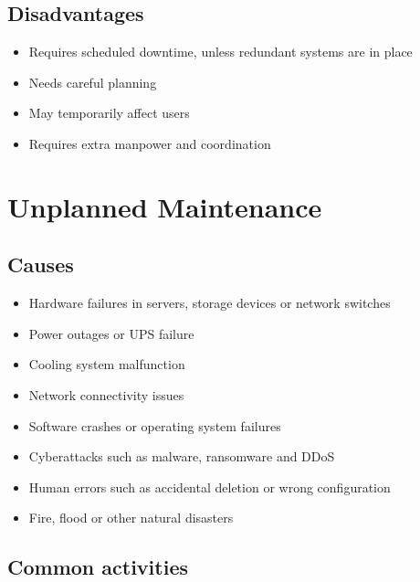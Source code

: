 \documentclass[11pt,a4paper]{article}
\begin{document}
\subsection{Disadvantages}

\begin{itemize}\itemsep2pt
  \item Requires scheduled downtime, unless redundant systems are in place
  \item Needs careful planning
  \item May temporarily affect users
  \item Requires extra manpower and coordination
\end{itemize}

\newpage
\section{Unplanned Maintenance}


\subsection{Causes}

\begin{itemize}\itemsep2pt
  \item Hardware failures in servers, storage devices or network switches
  \item Power outages or UPS failure
  \item Cooling system malfunction
  \item Network connectivity issues
  \item Software crashes or operating system failures
  \item Cyberattacks such as malware, ransomware and DDoS
  \item Human errors such as accidental deletion or wrong configuration
  \item Fire, flood or other natural disasters
\end{itemize}

\subsection{Common activities}
\end{document}
